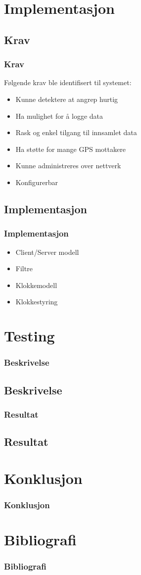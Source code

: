 \documentclass[xcolor=table]{beamer}
\begin{document}
\section{Implementasjon}
\subsection{Krav}
\begin{frame}
  \frametitle{Krav}
  Følgende krav ble identifisert til systemet:
  \begin{itemize}
    \item Kunne detektere at angrep hurtig
    \item Ha mulighet for å logge data
    \item Rask og enkel tilgang til innsamlet data
    \item Ha støtte for mange GPS mottakere
    \item Kunne administreres over nettverk
    \item Konfigurerbar 
  \end{itemize}
\end{frame}

\subsection{Implementasjon}
\begin{frame}
  \frametitle{Implementasjon}
  \begin{itemize}
    \item Client/Server modell
    \item Filtre
    \item Klokkemodell
    \item Klokkestyring
  \end{itemize}
\end{frame}

\section{Testing}
\begin{frame}
\frametitle{Beskrivelse}
  \subsection{Beskrivelse}
\end{frame}

\begin{frame}
\frametitle{Resultat}
  \subsection{Resultat}
\end{frame}

\section{Konklusjon}
\begin{frame}
  \frametitle{Konklusjon}
\end{frame}

\section{Bibliografi}
\begin{frame}[allowframebreaks]%
  \frametitle{Bibliografi}
  \printbibliography[heading=bibintoc]
\end{frame}
\end{document}
